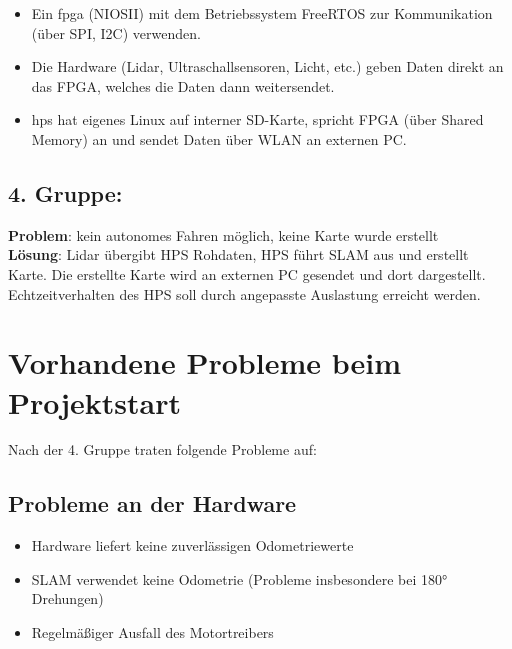 \begin{itemize}
\item Ein \acrfull{fpga} (NIOSII) mit dem Betriebssystem FreeRTOS zur Kommunikation (über SPI, I2C) verwenden.

\item Die Hardware (Lidar, Ultraschallsensoren, Licht, etc.) geben Daten direkt an das FPGA, welches die Daten dann weitersendet.

\item \acrfull{hps} hat eigenes Linux auf interner SD-Karte, spricht FPGA (über Shared Memory) an und sendet Daten über WLAN an externen PC.
\end{itemize}




\subsection*{4. Gruppe:} 

\textbf{Problem}: kein autonomes Fahren möglich, keine Karte wurde erstellt\\
\textbf{Lösung}: Lidar übergibt HPS Rohdaten, HPS führt SLAM aus und erstellt Karte. Die erstellte Karte wird an externen PC gesendet und dort dargestellt. Echtzeitverhalten des HPS soll durch angepasste Auslastung erreicht werden.


\section{Vorhandene Probleme beim Projektstart}


Nach der 4. Gruppe traten folgende Probleme auf:

\subsection*{Probleme an der Hardware}

\begin{itemize}
\item  Hardware liefert keine zuverlässigen Odometriewerte
\item  SLAM verwendet keine Odometrie (Probleme insbesondere bei 180° Drehungen)
\item Regelmäßiger Ausfall des Motortreibers
\end{itemize}







